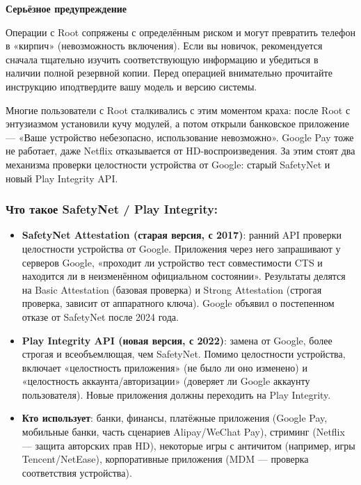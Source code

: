 \textbf{Серьёзное предупреждение}\par

Операции с Root сопряжены с определённым риском и могут превратить телефон в «кирпич» (невозможность включения). Если вы новичок, рекомендуется сначала тщательно изучить соответствующую информацию и убедиться в наличии полной резервной копии. Перед операцией внимательно прочитайте инструкцию иподтвердите вашу модель и версию системы.


Многие пользователи с Root сталкивались с этим моментом краха: после Root с энтузиазмом установили кучу модулей, а потом открыли банковское приложение — «Ваше устройство небезопасно, использование невозможно». Google Pay тоже не работает, даже Netflix отказывается от HD-воспроизведения. За этим стоят два механизма проверки целостности устройства от Google: старый SafetyNet и новый Play Integrity API.

\subsubsection*{Что такое SafetyNet / Play Integrity:}

\begin{itemize}
  \item \textbf{SafetyNet Attestation (старая версия, с 2017)}: ранний API проверки целостности устройства от Google. Приложения через него запрашивают у серверов Google, «проходит ли устройство тест совместимости CTS и находится ли в неизменённом официальном состоянии». Результаты делятся на Basic Attestation (базовая проверка) и Strong Attestation (строгая проверка, зависит от аппаратного ключа). Google объявил о постепенном отказе от SafetyNet после 2024 года.
  \item \textbf{Play Integrity API (новая версия, с 2022)}: замена от Google, более строгая и всеобъемлющая, чем SafetyNet. Помимо целостности устройства, включает «целостность приложения» (не было ли оно изменено) и «целостность аккаунта/авторизации» (доверяет ли Google аккаунту пользователя). Новые приложения должны переходить на Play Integrity.
  \item \textbf{Кто использует}: банки, финансы, платёжные приложения (Google Pay, мобильные банки, часть сценариев Alipay/WeChat Pay), стриминг (Netflix — защита авторских прав HD), некоторые игры с античитом (например, игры Tencent/NetEase), корпоративные приложения (MDM — проверка соответствия устройства).
\end{itemize}

